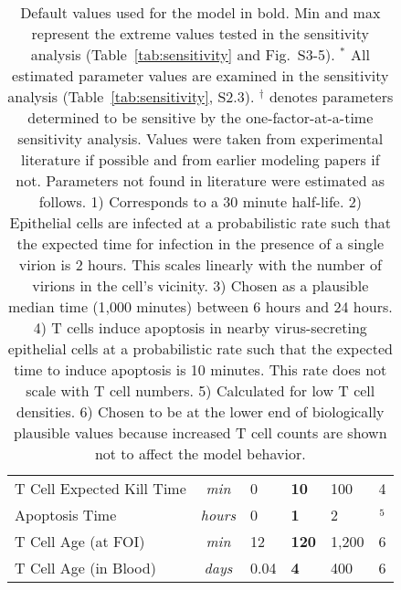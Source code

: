 \documentclass[preprint,10pt,numbers]{elsarticle}
\begin{document}
\begin{table}[!ht]
\begin{center}
\begin{tabular}{| l | c | l l l | c |}
  T Cell Expected Kill Time & \textit{min} & 0 & \textbf{10} & 100 & 4 \\
  Apoptosis Time & \textit{hours} & 0 & \textbf{1} & 2 & \citep{Ganusov2008}$^5$ \\
  T Cell Age (at FOI) & \textit{min} & 12 & \textbf{120} & 1,200 & 6 \\
  T Cell Age (in Blood) & \textit{days} & 0.04 & \textbf{4} & 400 & 6 \\
  \hline  
\end{tabular}
\caption{Default values used for the model in bold.  Min and max represent the extreme values tested in the sensitivity analysis (Table~\ref{tab:sensitivity} and Fig.~S3-5).  $^*$ All estimated parameter values are examined in the sensitivity analysis (Table~\ref{tab:sensitivity}, S2.3).  $^{\dagger}$ denotes parameters determined to be sensitive by the one-factor-at-a-time sensitivity analysis.  Values were taken from experimental literature if possible and from earlier modeling papers if not.  Parameters not found in literature were estimated as follows.  1) Corresponds to a 30 minute half-life.  2) Epithelial cells are infected at a probabilistic rate such that the expected time for infection in the presence of a single virion is 2 hours.  This scales linearly with the number of virions in the cell's vicinity.  3) Chosen as a plausible median time (1,000 minutes) between 6 hours and 24 hours.  4) T cells induce apoptosis in nearby virus-secreting epithelial cells at a probabilistic rate such that the expected time to induce apoptosis is 10 minutes.  This rate does not scale with T cell numbers.  5) Calculated for low T cell densities.  6) Chosen to be at the lower end of biologically plausible values because increased T cell counts are shown not to affect the model behavior. }
\label{tab:parameters}
\end{center}
\end{table}
\end{document}
